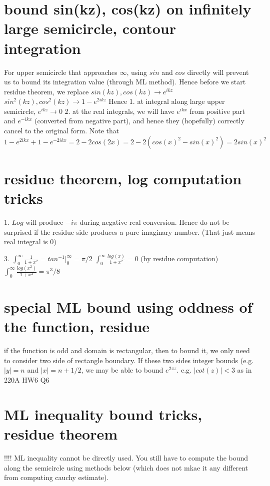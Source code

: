 {{ 
\section*{bound sin(kz), cos(kz) on infinitely large semicircle, contour integration}
For upper semicircle that approaches $\infty$, using $sin$ and $cos$ directly will prevent us to bound its integration value (through ML method). Hence before we start residue theorem, we replace
	$sin(kz), cos(kz) \to e^{ikz}$
	$sin^2(kz), cos^2(kz) \to 1-e^{2ikz}$
Hence
	1. at integral along large upper semicircle, $e^{ikz} \to 0$
    2. at the real integrals, we will have $e^{ikx}$ from positive part and $e^{-ikx}$ (converted from negative part), and hence they (hopefully) correctly cancel to the original form. Note that $1-e^{2ikx} + 1-e^{-2ikx} = 2 - 2cos(2x) = 2 - 2(cos(x)^2-sin(x)^2) = 2sin(x)^2$ 
 
 
\section*{residue theorem, log computation tricks}

1. $Log$ will produce $-i\pi$ during negative real conversion. Hence do not be surprised if the residue side produces a pure imaginary number. (That just means real integral is 0)

3. 
$\int_0^\infty \frac{1}{1+x^2} = tan^{-1}|_0^\infty = \pi/2$
$\int_0^\infty \frac{log(x)}{1+x^2} = 0$ (by residue computation)
$\int_0^\infty \frac{log(x^2)}{1+x^2} = \pi^3/8$
    
\section*{special ML bound using oddness of the function, residue}
    
    if the function is odd and domain is rectangular, then to bound it, we only need to consider two side of rectangle boundary. If these two sides integer bounds (e.g. $|y| = n$ and $|x| = n+1/2$, we may be able to bound $e^{2\pi z}$.
        e.g. $|cot(z)|<3$ as in 220A HW6 Q6
    
    
    
\section*{ML inequality bound tricks, residue theorem}

!!!! ML inequality cannot be directly used. You still have to compute the bound along the semicircle using methods below (which does not mkae it any different from computing cauchy estimate). 

}}
